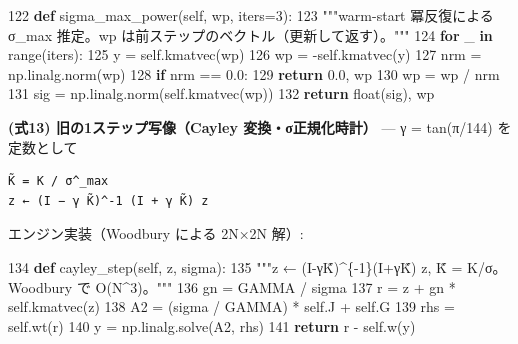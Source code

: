 \documentclass[
  a4paper,
]{ltjsarticle}
\newenvironment{Shaded}{}{}
\newcommand{\BuiltInTok}[1]{\textcolor[rgb]{0.00,0.50,0.00}{#1}}
\newcommand{\ControlFlowTok}[1]{\textcolor[rgb]{0.00,0.44,0.13}{\textbf{#1}}}
\newcommand{\DecValTok}[1]{\textcolor[rgb]{0.25,0.63,0.44}{#1}}
\newcommand{\FloatTok}[1]{\textcolor[rgb]{0.25,0.63,0.44}{#1}}
\newcommand{\KeywordTok}[1]{\textcolor[rgb]{0.00,0.44,0.13}{\textbf{#1}}}
\newcommand{\NormalTok}[1]{#1}
\newcommand{\OperatorTok}[1]{\textcolor[rgb]{0.40,0.40,0.40}{#1}}
\newcommand{\StringTok}[1]{\textcolor[rgb]{0.25,0.44,0.63}{#1}}
\newcommand{\VariableTok}[1]{\textcolor[rgb]{0.10,0.09,0.49}{#1}}
\begin{document}
\begin{Shaded}
\begin{Highlighting}[]
   \DecValTok{122}      \KeywordTok{def}\NormalTok{ sigma\_max\_power(}\VariableTok{self}\NormalTok{, wp, iters}\OperatorTok{=}\DecValTok{3}\NormalTok{):}
   \DecValTok{123}          \StringTok{"""warm{-}start 冪反復による σ\_max 推定。wp は前ステップのベクトル（更新して返す）。"""}
   \DecValTok{124}          \ControlFlowTok{for}\NormalTok{ \_ }\KeywordTok{in} \BuiltInTok{range}\NormalTok{(iters):}
   \DecValTok{125}\NormalTok{              y }\OperatorTok{=} \VariableTok{self}\NormalTok{.kmatvec(wp)}
   \DecValTok{126}\NormalTok{              wp }\OperatorTok{=} \OperatorTok{{-}}\VariableTok{self}\NormalTok{.kmatvec(y)}
   \DecValTok{127}\NormalTok{              nrm }\OperatorTok{=}\NormalTok{ np.linalg.norm(wp)}
   \DecValTok{128}              \ControlFlowTok{if}\NormalTok{ nrm }\OperatorTok{==} \FloatTok{0.0}\NormalTok{:}
   \DecValTok{129}                  \ControlFlowTok{return} \FloatTok{0.0}\NormalTok{, wp}
   \DecValTok{130}\NormalTok{              wp }\OperatorTok{=}\NormalTok{ wp }\OperatorTok{/}\NormalTok{ nrm}
   \DecValTok{131}\NormalTok{          sig }\OperatorTok{=}\NormalTok{ np.linalg.norm(}\VariableTok{self}\NormalTok{.kmatvec(wp))}
   \DecValTok{132}          \ControlFlowTok{return} \BuiltInTok{float}\NormalTok{(sig), wp}
\end{Highlighting}
\end{Shaded}

\textbf{(式13) 旧の1ステップ写像（Cayley 変換・σ正規化時計）} --- γ =
tan(π/144) を定数として

\begin{verbatim}
K̃ = K / σ^_max
z ← (I − γ K̃)^-1 (I + γ K̃) z
\end{verbatim}

エンジン実装（Woodbury による 2N×2N 解）:

\begin{Shaded}
\begin{Highlighting}[]
   \DecValTok{134}      \KeywordTok{def}\NormalTok{ cayley\_step(}\VariableTok{self}\NormalTok{, z, sigma):}
   \DecValTok{135}          \StringTok{"""z ← (I{-}γK̃)\^{}\{{-}1\}(I+γK̃) z, K̃ = K/σ。Woodbury で O(N\^{}3)。"""}
   \DecValTok{136}\NormalTok{          gn }\OperatorTok{=}\NormalTok{ GAMMA }\OperatorTok{/}\NormalTok{ sigma}
   \DecValTok{137}\NormalTok{          r }\OperatorTok{=}\NormalTok{ z }\OperatorTok{+}\NormalTok{ gn }\OperatorTok{*} \VariableTok{self}\NormalTok{.kmatvec(z)}
   \DecValTok{138}\NormalTok{          A2 }\OperatorTok{=}\NormalTok{ (sigma }\OperatorTok{/}\NormalTok{ GAMMA) }\OperatorTok{*} \VariableTok{self}\NormalTok{.J }\OperatorTok{+} \VariableTok{self}\NormalTok{.G}
   \DecValTok{139}\NormalTok{          rhs }\OperatorTok{=} \VariableTok{self}\NormalTok{.wt(r)}
   \DecValTok{140}\NormalTok{          y }\OperatorTok{=}\NormalTok{ np.linalg.solve(A2, rhs)}
   \DecValTok{141}          \ControlFlowTok{return}\NormalTok{ r }\OperatorTok{{-}} \VariableTok{self}\NormalTok{.w(y)}
\end{Highlighting}
\end{Shaded}
\end{document}

